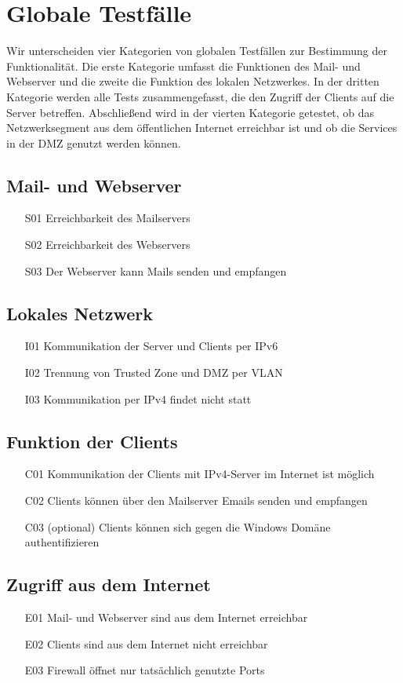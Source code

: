 \section{Globale Testfälle}

Wir unterscheiden vier Kategorien von globalen Testfällen zur Bestimmung der Funktionalität. Die erste Kategorie umfasst die Funktionen des Mail- und Webserver und die zweite die Funktion des lokalen Netzwerkes. In der dritten Kategorie werden alle Tests zusammengefasst, die den Zugriff der Clients auf die Server betreffen. Abschließend wird in der vierten Kategorie getestet, ob das Netzwerksegment aus dem öffentlichen Internet erreichbar ist und ob die Services in der DMZ genutzt werden können.

\subsection{Mail- und Webserver}
\begin{itemize}
	\item[S01] Erreichbarkeit des Mailservers
	\item[S02] Erreichbarkeit des Webservers
	\item[S03] Der Webserver kann Mails senden und empfangen
\end{itemize}
\subsection{Lokales Netzwerk}
\begin{itemize}
	\item[I01] Kommunikation der Server und Clients per IPv6
	\item[I02] Trennung von Trusted Zone und DMZ per VLAN
	\item[I03] Kommunikation per IPv4 findet nicht statt
\end{itemize}
\subsection{Funktion der Clients}
\begin{itemize}
	\item[C01] Kommunikation der Clients mit IPv4-Server im Internet ist möglich
	\item[C02] Clients können über den Mailserver Emails senden und empfangen
	\item[C03] (optional) Clients können sich gegen die Windows Domäne authentifizieren
\end{itemize}
\subsection{Zugriff aus dem Internet}
\begin{itemize}
	\item[E01] Mail- und Webserver sind aus dem Internet erreichbar
	\item[E02] Clients sind aus dem Internet nicht erreichbar
	\item[E03] Firewall öffnet nur tatsächlich genutzte Ports
\end{itemize}

